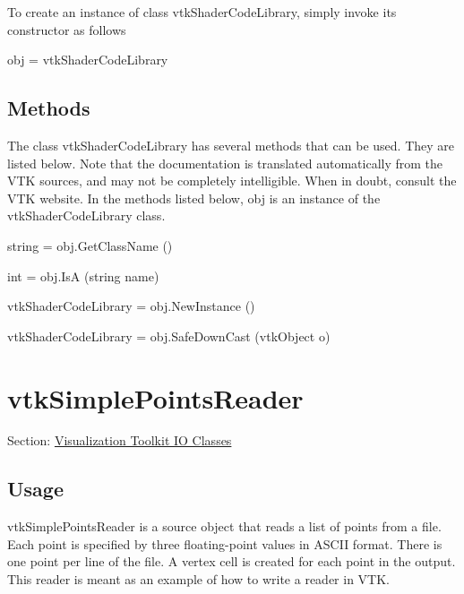To create an instance of class vtk\-Shader\-Code\-Library, simply invoke its constructor as follows \begin{DoxyVerb}  obj = vtkShaderCodeLibrary
\end{DoxyVerb}
 \hypertarget{vtkwidgets_vtkxyplotwidget_Methods}{}\subsection{Methods}\label{vtkwidgets_vtkxyplotwidget_Methods}
The class vtk\-Shader\-Code\-Library has several methods that can be used. They are listed below. Note that the documentation is translated automatically from the V\-T\-K sources, and may not be completely intelligible. When in doubt, consult the V\-T\-K website. In the methods listed below, {\ttfamily obj} is an instance of the vtk\-Shader\-Code\-Library class. 
\begin{DoxyItemize}
\item {\ttfamily string = obj.\-Get\-Class\-Name ()}  
\item {\ttfamily int = obj.\-Is\-A (string name)}  
\item {\ttfamily vtk\-Shader\-Code\-Library = obj.\-New\-Instance ()}  
\item {\ttfamily vtk\-Shader\-Code\-Library = obj.\-Safe\-Down\-Cast (vtk\-Object o)}  
\end{DoxyItemize}\hypertarget{vtkio_vtksimplepointsreader}{}\section{vtk\-Simple\-Points\-Reader}\label{vtkio_vtksimplepointsreader}
Section\-: \hyperlink{sec_vtkio}{Visualization Toolkit I\-O Classes} \hypertarget{vtkwidgets_vtkxyplotwidget_Usage}{}\subsection{Usage}\label{vtkwidgets_vtkxyplotwidget_Usage}
vtk\-Simple\-Points\-Reader is a source object that reads a list of points from a file. Each point is specified by three floating-\/point values in A\-S\-C\-I\-I format. There is one point per line of the file. A vertex cell is created for each point in the output. This reader is meant as an example of how to write a reader in V\-T\-K.

